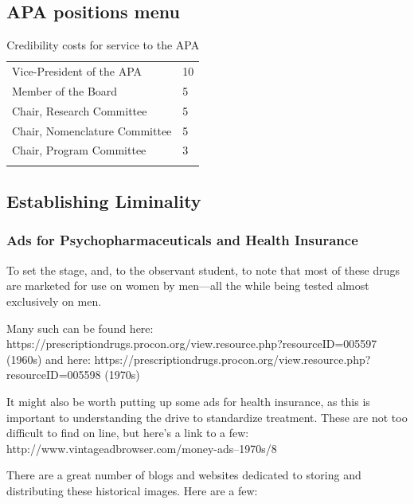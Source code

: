 \begin{refsection}
\newpage

\subsection{APA positions menu}
\label{apapositionsmenu}



    \noindent
  \begin{longtable}[!t]{ | P{7cm} | P{2cm}  | } \hline
{}& \\ \hline 
Vice-President of the APA& 10\\ \hline
Member of the Board &  5\\ \hline
Chair, Research Committee &  5\\ \hline
Chair, Nomenclature Committee &  5\\ \hline
Chair, Program Committee &  3\\ \hline
\caption{Credibility costs for service to the APA}
\label{sample: credibilitypointsmenu}   
\end{longtable}   

  \pagebreak


\subsection{Establishing Liminality}
\label{establishingliminality}

\subsubsection{Ads for Psychopharmaceuticals and Health Insurance}
\label{adsforpsychopharmaceuticalsandhealthinsurance}

To set the stage, and, to the observant student, to note that most of these drugs are marketed for use on women by men---all the while being tested almost exclusively on men.

Many such can be found here: https:\slash \slash prescriptiondrugs.procon.org\slash view.resource.php?resourceID=005597 (1960s) and here: https:\slash \slash prescriptiondrugs.procon.org\slash view.resource.php?resourceID=005598 (1970s)

It might also be worth putting up some ads for health insurance, as this is important to understanding the drive to standardize treatment. These are not too difficult to find on line, but here’s a link to a few: http:\slash \slash www.vintageadbrowser.com\slash money-ads--1970s\slash 8 

There are a great number of blogs and websites dedicated to storing and distributing these historical images. Here are a few:


\end{refsection}
